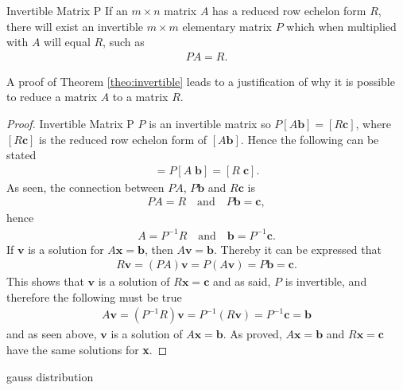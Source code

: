 \begin{theorem}{Invertible Matrix P} \label{the:PMatrix}
    If an $m \times n$ matrix $A$ has a reduced row echelon form $R$, there will exist an invertible $m \times m$ elementary matrix $P$ which when multiplied with $A$ will equal $R$, such as
    \begin{align*}
        PA=R.
    \end{align*}
    \cite[127]{LiAl}
    \label{theo:invertible}
\end{theorem}
A proof of Theorem \ref{theo:invertible} leads to a justification of why it is possible to reduce a matrix $A$ to a matrix $R$.
\begin{proof}{Invertible Matrix P}
    $P$ is an invertible matrix so $P[A\mathbf{b}]=[R\mathbf{c}]$, where $[R\mathbf{c}]$ is the reduced row echelon form of $[A\mathbf{b}]$. 
    Hence the following can be stated
    \begin{align*}
        [PA\;P\mathbf{b}]=P[A\;\mathbf{b}]=[R\;\mathbf{c}].
    \end{align*}
    As seen, the connection between $PA$, $P\mathbf{b}$ and $R\mathbf{c}$ is
    \begin{align*}
        PA=R \quad\text{and}\quad P\mathbf{b}=\mathbf{c},
    \end{align*}
    hence
    \begin{align*}
        A = P^{-1}R \quad \text{and} \quad \mathbf{b} = P^{-1}\mathbf{c}.
    \end{align*}
    If $\mathbf{v}$ is a solution for $A\mathbf{x}=\mathbf{b}$, then $A\mathbf{v}=\mathbf{b}$. Thereby it can be expressed that 
    \begin{align*}
        R\mathbf{v}=(PA)\mathbf{v}=P(A\mathbf{v})=P\mathbf{b}=\mathbf{c}.
    \end{align*}
    This shows that $\mathbf{v}$ is a solution of $R\mathbf{x}=\mathbf{c}$
    and as said, $P$ is invertible, and therefore the following must be true
    \begin{align*}
        A\mathbf{v}=(P^{-1}R)\mathbf{v}=P^{-1}(R\mathbf{v})=P^{-1}\mathbf{c}=\mathbf{b}
    \end{align*}
    and as seen above, $\mathbf{v}$ is a solution of $A\mathbf{x}=\mathbf{b}$. As proved, $A\mathbf{x}=\mathbf{b}$ and $R\mathbf{x}=\mathbf{c}$ have the same solutions for \textbf{x}. \qedsymbol
\end{proof}


gauss distribution
